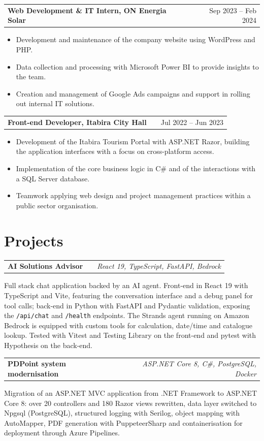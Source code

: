 \documentclass[a4paper,11pt]{article}
\makeatletter
\newenvironment{jobshort}[2]
    {
    \begin{tabularx}{\linewidth}{@{}l X r@{}}
    \textbf{#1} & \hfill &  #2 \\[3.75pt]
    \end{tabularx}
    }
    {
    }
\newenvironment{joblong}[2]
    {
    \begin{tabularx}{\linewidth}{@{}l X r@{}}
    \textbf{#1} & \hfill &  #2 \\[3.75pt]
    \end{tabularx}
    \begin{minipage}[t]{\linewidth}
    \begin{itemize}[nosep,after=\strut, leftmargin=1em, itemsep=3pt,label=--]
    }
    {
    \end{itemize}
    \end{minipage}
    }
\makeatother
\begin{document}
\begin{joblong}{Web Development \& IT Intern, ON Energia Solar}{Sep 2023 -- Feb 2024}
\item Development and maintenance of the company website using WordPress and PHP.
\item Data collection and processing with Microsoft Power BI to provide insights to the team.
\item Creation and management of Google Ads campaigns and support in rolling out internal IT solutions.
\end{joblong}

\begin{joblong}{Front-end Developer, Itabira City Hall}{Jul 2022 -- Jun 2023}
\item Development of the Itabira Tourism Portal with ASP.NET Razor, building the application interfaces with a focus on cross-platform access.
\item Implementation of the core business logic in C\# and of the interactions with a SQL Server database.
\item Teamwork applying web design and project management practices within a public sector organisation.
\end{joblong}

\section{Projects}

\begin{jobshort}{AI Solutions Advisor}{\textit{React 19, TypeScript, FastAPI, Bedrock}}
Full stack chat application backed by an AI agent. Front-end in React 19 with TypeScript and Vite, featuring the conversation interface and a debug panel for tool calls; back-end in Python with FastAPI and Pydantic validation, exposing the \texttt{/api/chat} and \texttt{/health} endpoints. The Strands agent running on Amazon Bedrock is equipped with custom tools for calculation, date/time and catalogue lookup. Tested with Vitest and Testing Library on the front-end and pytest with Hypothesis on the back-end.
\end{jobshort}

\begin{jobshort}{PDPoint system modernisation}{\textit{ASP.NET Core 8, C\#, PostgreSQL, Docker}}
Migration of an ASP.NET MVC application from .NET Framework to ASP.NET Core 8: over 20 controllers and 180 Razor views rewritten, data layer switched to Npgsql (PostgreSQL), structured logging with Serilog, object mapping with AutoMapper, PDF generation with PuppeteerSharp and containerisation for deployment through Azure Pipelines.
\end{jobshort}
\end{document}
